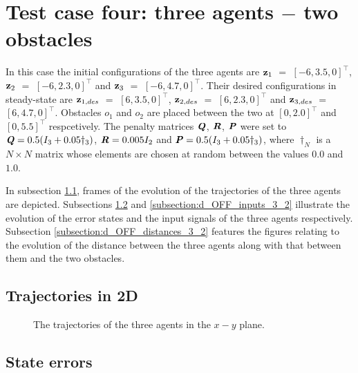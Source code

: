 \section{Test case four: three agents $-$ two obstacles}

In this case the initial configurations of the three agents are
$\bm{\mathbf{z}}_1$ $=$ $[-6, 3.5, 0]^{\top}$,
$\bm{\mathbf{z}}_2$ $=$ $[-6, 2.3, 0]^{\top}$ and
$\bm{\mathbf{z}}_3$ $=$ $[-6, 4.7, 0]^{\top}$.
Their desired configurations in steady-state are
$\bm{\mathbf{z}}_{1,des}$ $=$ $[6, 3.5, 0]^{\top}$,
$\bm{\mathbf{z}}_{2,des}$ $=$ $[6, 2.3, 0]^{\top}$ and
$\bm{\mathbf{z}}_{3,des}$ $=$ $[6, 4.7, 0]^{\top}$.
Obstacles $o_1$ and $o_2$ are placed between the two at $[0, 2.0]^{\top}$
and $[0, 5.5]^{\top}$ respcetively. The penalty
matrices $\bm{\mathit{Q}}$, $\bm{\mathit{R}}$, $\bm{\mathit{P}}$ were set to
$\bm{\mathit{Q}} = 0.5 (I_3 + 0.05\dagger_3)$, $\bm{\mathit{R}} = 0.005 I_2$ and
$\bm{\mathit{P}} = 0.5 (I_3 + 0.05\dagger_3)$, where $\dagger_N$ is a $N \times N$
matrix whose elements are chosen at random between the values $0.0$ and $1.0$.

In subsection \ref{subsection:d_OFF_trajectories_3_2}, frames of the evolution of the
trajectories of the three agents are depicted. Subsections
\ref{subsection:d_OFF_errors_3_2} and \ref{subsection:d_OFF_inputs_3_2} illustrate
the evolution of the error states and the input signals of the three agents
respectively. Subsection \ref{subsection:d_OFF_distances_3_2} features the
figures relating to the evolution of the distance between the three agents
along with that between them and the two obstacles.


\subsection{Trajectories in 2D}
\label{subsection:d_OFF_trajectories_3_2}

\begin{figure}[H]
  
  \caption{The trajectories of the three agents in the $x-y$ plane.}
  \label{fig:d_OFF_trajectory_3_2}
\end{figure}



\subsection{State errors}
\label{subsection:d_OFF_errors_3_2}

